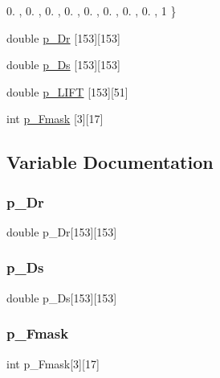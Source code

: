 \begin{DoxyCompactItemize}
0. , 0. , 0. , 0. , 0. , 0. , 0. , 0. , 1 \}
\item 
double \hyperlink{a00551_ab69225d7fa0dd51f71bf70c781503c0a}{p\+\_\+\+Dr} \mbox{[}153\mbox{]}\mbox{[}153\mbox{]}
\item 
double \hyperlink{a00551_a77cd6955fa5a4fc804064578fd23409f}{p\+\_\+\+Ds} \mbox{[}153\mbox{]}\mbox{[}153\mbox{]}
\item 
double \hyperlink{a00551_ac3ec959534b6b24a9118de14af3e11b5}{p\+\_\+\+L\+I\+FT} \mbox{[}153\mbox{]}\mbox{[}51\mbox{]}
\item 
int \hyperlink{a00551_a701d688fbe4e4d919ede69129a282bce}{p\+\_\+\+Fmask} \mbox{[}3\mbox{]}\mbox{[}17\mbox{]}
\end{DoxyCompactItemize}


\subsection{Variable Documentation}
\mbox{\label{a00551_ab69225d7fa0dd51f71bf70c781503c0a}} 
\subsubsection{\texorpdfstring{p\+\_\+\+Dr}{p\_Dr}}
{\footnotesize\ttfamily double p\+\_\+\+Dr\mbox{[}153\mbox{]}\mbox{[}153\mbox{]}}

\mbox{\label{a00551_a77cd6955fa5a4fc804064578fd23409f}} 
\subsubsection{\texorpdfstring{p\+\_\+\+Ds}{p\_Ds}}
{\footnotesize\ttfamily double p\+\_\+\+Ds\mbox{[}153\mbox{]}\mbox{[}153\mbox{]}}

\mbox{\label{a00551_a701d688fbe4e4d919ede69129a282bce}} 
\subsubsection{\texorpdfstring{p\+\_\+\+Fmask}{p\_Fmask}}
{\footnotesize\ttfamily int p\+\_\+\+Fmask\mbox{[}3\mbox{]}\mbox{[}17\mbox{]}}

